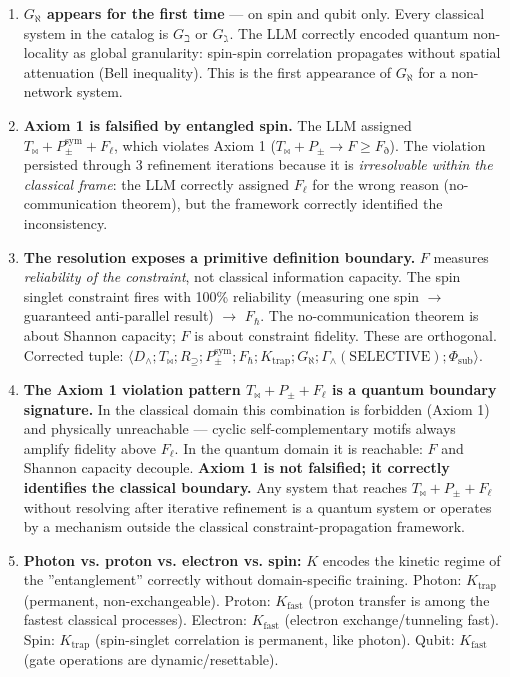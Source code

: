 \documentclass[12pt,a4paper]{article}
\begin{document}
\begin{enumerate}
    \item \textbf{$G_{\aleph}$ appears for the first time} --- on spin and qubit only. Every classical system in the catalog is $G_{\beth}$ or $G_{\gimel}$. The LLM correctly encoded quantum non-locality as global granularity: spin-spin correlation propagates without spatial attenuation (Bell inequality). This is the first appearance of $G_{\aleph}$ for a non-network system.
    \item \textbf{Axiom 1 is falsified by entangled spin.} The LLM assigned $T_{\bowtie} + P_{\pm}^{\text{sym}} + F_{\ell}$, which violates Axiom 1 ($T_{\bowtie} + P_{\pm} \to F \geq F_{\eth}$). The violation persisted through 3 refinement iterations because it is \emph{irresolvable within the classical frame}: the LLM correctly assigned $F_{\ell}$ for the wrong reason (no-communication theorem), but the framework correctly identified the inconsistency.
    \item \textbf{The resolution exposes a primitive definition boundary.} $F$ measures \emph{reliability of the constraint}, not classical information capacity. The spin singlet constraint fires with 100\% reliability (measuring one spin $\to$ guaranteed anti-parallel result) $\to$ $F_{\hbar}$. The no-communication theorem is about Shannon capacity; $F$ is about constraint fidelity. These are orthogonal. Corrected tuple: $\langle D_{\wedge}; T_{\bowtie}; R_{\supseteq}; P_{\pm}^{\text{sym}}; F_{\hbar}; K_{\text{trap}}; G_{\aleph}; \Gamma_{\wedge}(\text{SELECTIVE}); \Phi_{\text{sub}} \rangle$.
    \item \textbf{The Axiom 1 violation pattern $T_{\bowtie} + P_{\pm} + F_{\ell}$ is a quantum boundary signature.} In the classical domain this combination is forbidden (Axiom 1) and physically unreachable --- cyclic self-complementary motifs always amplify fidelity above $F_{\ell}$. In the quantum domain it is reachable: $F$ and Shannon capacity decouple. \textbf{Axiom 1 is not falsified; it correctly identifies the classical boundary.} Any system that reaches $T_{\bowtie} + P_{\pm} + F_{\ell}$ without resolving after iterative refinement is a quantum system or operates by a mechanism outside the classical constraint-propagation framework.
    \item \textbf{Photon vs. proton vs. electron vs. spin:} $K$ encodes the kinetic regime of the ''entanglement'' correctly without domain-specific training. Photon: $K_{\text{trap}}$ (permanent, non-exchangeable). Proton: $K_{\text{fast}}$ (proton transfer is among the fastest classical processes). Electron: $K_{\text{fast}}$ (electron exchange/tunneling fast). Spin: $K_{\text{trap}}$ (spin-singlet correlation is permanent, like photon). Qubit: $K_{\text{fast}}$ (gate operations are dynamic/resettable).
\end{enumerate}
\end{document}
